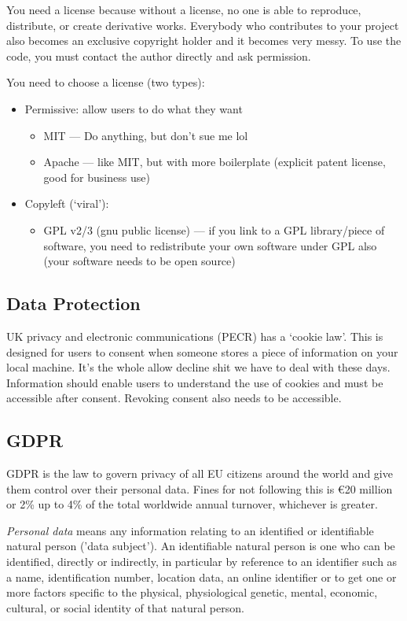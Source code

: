 \documentclass[11pt,a4paper,titlepage,dvipsnames,cmyk]{scrartcl}
\begin{document}
You need a license because without a license, no one is able to reproduce, distribute, or create derivative works. Everybody who contributes to your project also becomes an exclusive copyright holder and it becomes very messy. To use the code, you must contact the author directly and ask permission.

You need to choose a license (two types):
\begin{itemize}
    \item Permissive: allow users to do what they want
    \begin{itemize}
        \item MIT --- Do anything, but don't sue me lol
        \item Apache --- like MIT, but with more boilerplate (explicit patent license, good for business use)
    \end{itemize}
    \item  Copyleft (`viral'): 
    \begin{itemize}
        \item GPL v2/3 (gnu public license) --- if you link to a GPL library/piece of software, you need to redistribute your own software under GPL also (your software needs to be open source)
    \end{itemize}
\end{itemize}

\subsection{Data Protection}
UK privacy and electronic communications (PECR) has a `cookie law'. This is designed for users to consent when someone stores a piece of information on your local machine. It's the whole allow decline shit we have to deal with these days. Information should enable users to understand the use of cookies and must be accessible after consent. Revoking consent also needs to be accessible.

\subsection{GDPR}
GDPR is the law to govern privacy of all EU citizens around the world and give them control over their personal data. Fines for not following this is €20 million or 2\% up to 4\% of the total worldwide annual turnover, whichever is greater.

\textit{Personal data} means any information relating to an identified or identifiable natural person ('data subject'). An identifiable natural person is one who can be identified, directly or indirectly, in particular by reference to an identifier such as a name, identification number, location data, an online identifier or to get one or more factors specific to the physical, physiological genetic, mental, economic, cultural, or social identity of that natural person.
\end{document}
